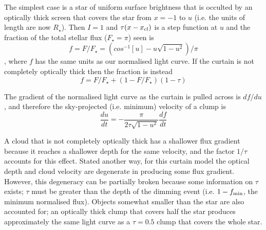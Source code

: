 \documentclass[useAMS,usenatbib,usegraphicx]{mn2e}
\begin{document}

The simplest case is a star of uniform surface brightness that is occulted by an
optically thick screen that covers the star from $x=-1$ to $u$ (i.e. the units of length
are now $R_\star$). Then $I=1$ and $\tau(x-x_{\rm cl})$ is a step function at $u$ and the
fraction of the total stellar flux ($F_\star = \pi$) seen is
\begin{equation}
  f = F/F_\star = (cos^{-1}[u] - u\sqrt{1-u^2})/\pi
\end{equation}
\citep{2006ApJ...644..510W}, where $f$ has the same units as our normalised light
curve. If the curtain is not completely optically thick then the fraction is instead
\begin{equation}
 f = F/F_\star + (1-F/F_\star)(1-\tau)
\end{equation}

The gradient of the normalised light curve as the curtain is pulled across is $df/du$,
and therefore the sky-projected (i.e. minimum) velocity of a clump is
\begin{equation}
  \frac{du}{dt} = -\frac{\pi}{2 \tau \sqrt{1-u^2}}\frac{df}{dt}
\end{equation}

A cloud that is not completely optically thick has a shallower flux gradient because it
reaches a shallower depth for the same velocity, and the factor $1/\tau$ accounts for
this effect. Stated another way, for this curtain model the optical depth and cloud
velocity are degenerate in producing some flux gradient. However, this degeneracy can be
partially broken because some information on $\tau$ exists; $\tau$ must be greater than
the depth of the dimming event (i.e. $1- f_{\rm min}$, the minimum normalised
flux). Objects somewhat smaller than the star are also accounted for; an optically thick
clump that covers half the star produces approximately the same light curve as a
$\tau=0.5$ clump that covers the whole star.
\end{document}
